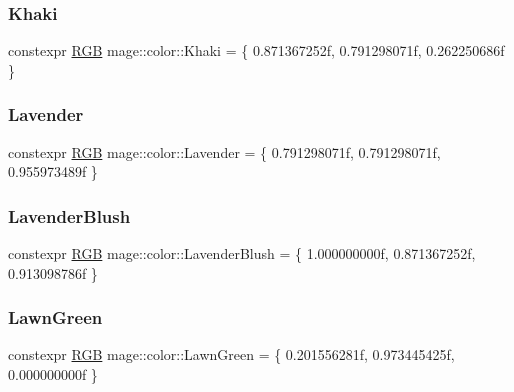 \subsubsection{\texorpdfstring{Khaki}{Khaki}}
{\footnotesize\ttfamily constexpr \hyperlink{structmage_1_1_r_g_b}{R\+GB} mage\+::color\+::\+Khaki = \{ 0.\+871367252f, 0.\+791298071f, 0.\+262250686f \}}

\hypertarget{namespacemage_1_1color_aa245a4aee08d18691655685f3918491d}{}\label{namespacemage_1_1color_aa245a4aee08d18691655685f3918491d} 
\subsubsection{\texorpdfstring{Lavender}{Lavender}}
{\footnotesize\ttfamily constexpr \hyperlink{structmage_1_1_r_g_b}{R\+GB} mage\+::color\+::\+Lavender = \{ 0.\+791298071f, 0.\+791298071f, 0.\+955973489f \}}

\hypertarget{namespacemage_1_1color_a1931b51916699fe6043528085a744912}{}\label{namespacemage_1_1color_a1931b51916699fe6043528085a744912} 
\subsubsection{\texorpdfstring{Lavender\+Blush}{LavenderBlush}}
{\footnotesize\ttfamily constexpr \hyperlink{structmage_1_1_r_g_b}{R\+GB} mage\+::color\+::\+Lavender\+Blush = \{ 1.\+000000000f, 0.\+871367252f, 0.\+913098786f \}}

\hypertarget{namespacemage_1_1color_abb5025143228ccad532fc59bc3e0326c}{}\label{namespacemage_1_1color_abb5025143228ccad532fc59bc3e0326c} 
\subsubsection{\texorpdfstring{Lawn\+Green}{LawnGreen}}
{\footnotesize\ttfamily constexpr \hyperlink{structmage_1_1_r_g_b}{R\+GB} mage\+::color\+::\+Lawn\+Green = \{ 0.\+201556281f, 0.\+973445425f, 0.\+000000000f \}}

\hypertarget{namespacemage_1_1color_a978bfddad2cebc2e3016ae777e2c420d}{}\label{namespacemage_1_1color_a978bfddad2cebc2e3016ae777e2c420d} 

